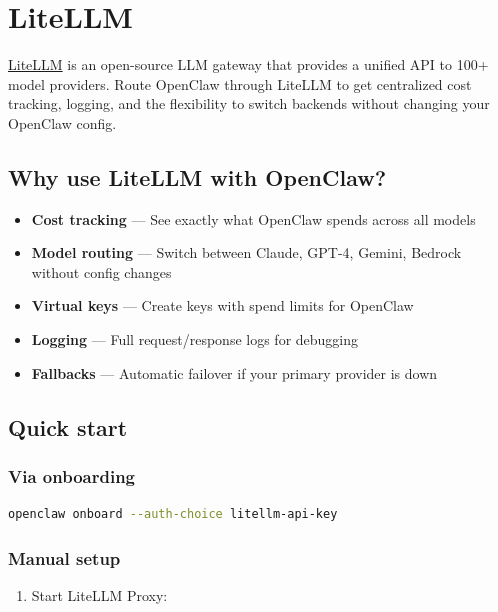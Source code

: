 \clearpage

\section{LiteLLM}


\href{https://litellm.ai}{LiteLLM} is an open-source LLM gateway that provides a unified API to 100+ model providers. Route OpenClaw through LiteLLM to get centralized cost tracking, logging, and the flexibility to switch backends without changing your OpenClaw config.

\subsection{Why use LiteLLM with OpenClaw?}


\begin{itemize}
  \item \textbf{Cost tracking} — See exactly what OpenClaw spends across all models
  \item \textbf{Model routing} — Switch between Claude, GPT-4, Gemini, Bedrock without config changes
  \item \textbf{Virtual keys} — Create keys with spend limits for OpenClaw
  \item \textbf{Logging} — Full request/response logs for debugging
  \item \textbf{Fallbacks} — Automatic failover if your primary provider is down
\end{itemize}


\subsection{Quick start}


\subsubsection{Via onboarding}


\begin{lstlisting}[language=bash]
openclaw onboard --auth-choice litellm-api-key
\end{lstlisting}


\subsubsection{Manual setup}


\begin{enumerate}
  \item Start LiteLLM Proxy:
\end{enumerate}


